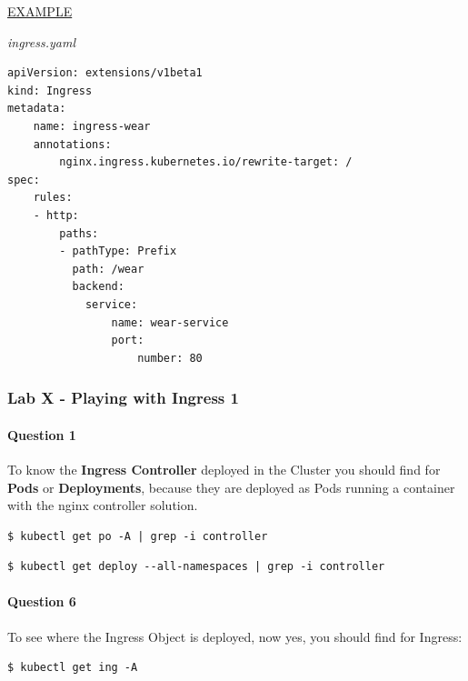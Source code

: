\documentclass{article}
\newenvironment{codetemplate}[1][]{%
  \mybasecolorbox[#1]
  \itshape
}{%
  \endmybasecolorbox
}
\begin{document}
\underline{EXAMPLE}

\begin{codetemplate}{ingress.yaml}
\begin{verbatim}
apiVersion: extensions/v1beta1
kind: Ingress
metadata:
    name: ingress-wear
    annotations:
        nginx.ingress.kubernetes.io/rewrite-target: /
spec:
    rules:
    - http:
        paths:
        - pathType: Prefix
          path: /wear
          backend:
            service:
                name: wear-service
                port:
                    number: 80
\end{verbatim}
\end{codetemplate}

\subsubsection{Lab X - Playing with Ingress 1}

\paragraph{Question 1}

To know the \textbf{Ingress Controller} deployed in the Cluster you should find for \textbf{Pods} or \textbf{Deployments}, because they are deployed as Pods running a container with the nginx controller solution.
\begin{codetemplate}{}
\begin{verbatim}
$ kubectl get po -A | grep -i controller
\end{verbatim}
\end{codetemplate}
\begin{codetemplate}{}
\begin{verbatim}
$ kubectl get deploy --all-namespaces | grep -i controller
\end{verbatim}
\end{codetemplate}

\paragraph{Question 6}
To see where the Ingress Object is deployed, now yes, you should find for Ingress:
\begin{codetemplate}{}
\begin{verbatim}
$ kubectl get ing -A
\end{verbatim}
\end{codetemplate}
\end{document}
